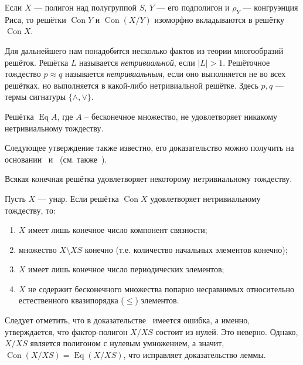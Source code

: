 \documentclass[11pt,twoside,final
]{article}
\def\Con{\operatorname{Con}}
\def\Eq{\operatorname{Eq}}
\begin{document}
\begin{lemma} \label{lemma:1}
	Если $X$ — полигон над полугруппой $S$, $Y$ — его подполигон и $\rho_Y$ — конгруэнция Риса, то решётки $\Con Y$ и $\Con (X/Y)$ изоморфно вкладываются в решётку $\Con X$.
\end{lemma}

Для дальнейшего нам понадобится несколько фактов из теории многообразий решёток.
Решётка $L$ называется \textit{нетривиальной}, если $|L| > 1$.
Решёточное тождество $p \approx q$ называется \textit{нетривиальным}, если оно выполняется не во всех решётках, но выполняется в какой-либо нетривиальной решётке.
Здесь $p,q$ — термы сигнатуры $\{ \land , \lor \}$.

\begin{lemma} \label{lemma:2}
	Решётка $\Eq A$, где $A$ -- бесконечное множество, не удовлетворяет никакому нетривиальному тождеству.
\end{lemma}

Следующее утверждение также известно, его доказательство можно получить на основании~\cite[следствие 3.14]{Kohn_9} и~\cite[теорема 8 главы VI]{en_Gretzer_10} (см. также~\cite[лемма 3]{Kozhukhov_8}).
\begin{lemma}\label{lemma:3}
	Всякая конечная решётка удовлетворяет некоторому нетривиальному тождеству.
\end{lemma}

\begin{lemma} \label{lemma:4}
	Пусть $X$ — унар.
	Если решётка $\Con X$ удовлетворяет нетривиальному тождеству, то:
	\begin{enumerate}
		\item $X$ имеет лишь конечное число компонент связности;
		\item множество $X \setminus XS$ конечно (т.е. количество начальных элементов конечно);
		\item $X$ имеет лишь конечное число периодических элементов;
		\item $X$ не содержит бесконечного множества попарно несравнимых относительно естественного квазипорядка ($\leqslant$) элементов.
	\end{enumerate}
\end{lemma}

Следует отметить, что в доказательстве~\cite[лемма 4(2)]{Kozhukhov_8} имеется ошибка, а именно, утверждается, что фактор-полигон $X / XS$ состоит из нулей.
Это неверно. Однако, $X / XS$ является полигоном с нулевым умножением, а значит, $\Con (X/XS) = \Eq (X/XS)$, что исправляет доказательство леммы.
\end{document}
